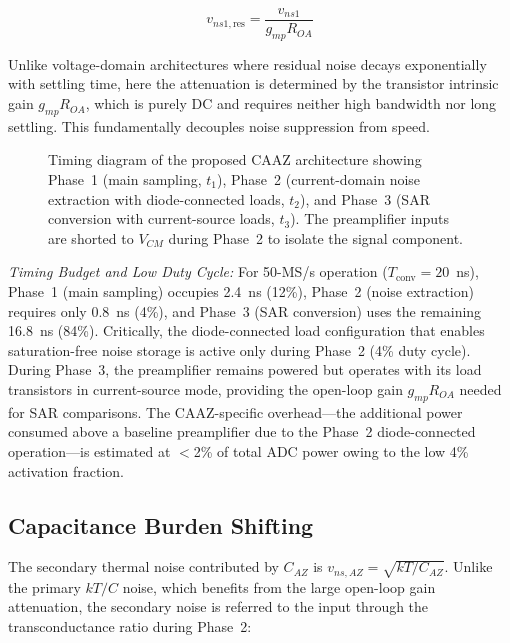 \documentclass[journal]{IEEEtran}
\begin{document}
\begin{equation}
v_{ns1,\text{res}} = \frac{v_{ns1}}{g_{mp}R_{OA}}
\label{eq:residual_current}
\end{equation}

Unlike voltage-domain architectures where residual noise decays exponentially with settling time, here the attenuation is determined by the transistor intrinsic gain $g_{mp}R_{OA}$, which is purely DC and requires neither high bandwidth nor long settling. This fundamentally decouples noise suppression from speed.

\begin{figure}[!t]
\centering
{}
\caption{Timing diagram of the proposed CAAZ architecture showing Phase~1 (main sampling, $t_1$), Phase~2 (current-domain noise extraction with diode-connected loads, $t_2$), and Phase~3 (SAR conversion with current-source loads, $t_3$). The preamplifier inputs are shorted to $V_{CM}$ during Phase~2 to isolate the signal component.}
\label{fig:timing}
\end{figure}

\textit{Timing Budget and Low Duty Cycle:} For 50-MS/s operation ($T_{\text{conv}} = 20$~ns), Phase~1 (main sampling) occupies 2.4~ns (12\%), Phase~2 (noise extraction) requires only 0.8~ns (4\%), and Phase~3 (SAR conversion) uses the remaining 16.8~ns (84\%). Critically, the diode-connected load configuration that enables saturation-free noise storage is active only during Phase~2 (4\% duty cycle). During Phase~3, the preamplifier remains powered but operates with its load transistors in current-source mode, providing the open-loop gain $g_{mp}R_{OA}$ needed for SAR comparisons. The CAAZ-specific overhead---the additional power consumed above a baseline preamplifier due to the Phase~2 diode-connected operation---is estimated at $<$2\% of total ADC power owing to the low 4\% activation fraction.

\subsection{Capacitance Burden Shifting}
\label{sec:burden_shifting}

The secondary thermal noise contributed by $C_{AZ}$ is $v_{ns,AZ} = \sqrt{kT/C_{AZ}}$. Unlike the primary $kT/C$ noise, which benefits from the large open-loop gain attenuation, the secondary noise is referred to the input through the transconductance ratio during Phase~2:
\end{document}
